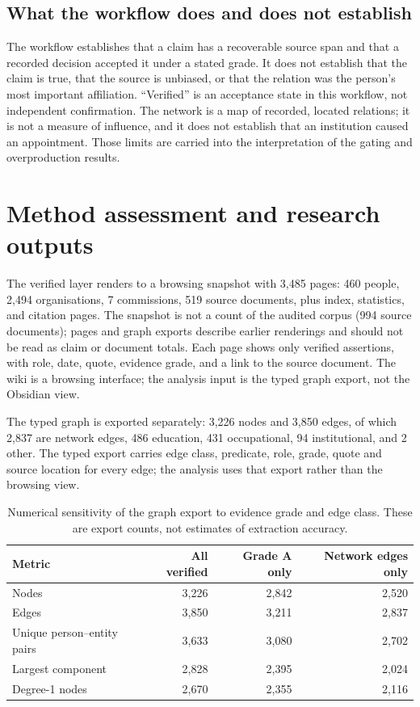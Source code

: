 \documentclass[11pt,a4paper]{article}
\begin{document}
\subsection{What the workflow does and does not establish}

The workflow establishes that a claim has a recoverable source span and that a recorded decision accepted it under a stated grade. It does not establish that the claim is true, that the source is unbiased, or that the relation was the person's most important affiliation. ``Verified'' is an acceptance state in this workflow, not independent confirmation. The network is a map of recorded, located relations; it is not a measure of influence, and it does not establish that an institution caused an appointment. Those limits are carried into the interpretation of the gating and overproduction results.

\section{Method assessment and research outputs}

The verified layer renders to a browsing snapshot with 3,485 pages: 460 people, 2,494 organisations, 7 commissions, 519 source documents, plus index, statistics, and citation pages. The snapshot is not a count of the audited corpus (994 source documents); pages and graph exports describe earlier renderings and should not be read as claim or document totals. Each page shows only verified assertions, with role, date, quote, evidence grade, and a link to the source document. The wiki is a browsing interface; the analysis input is the typed graph export, not the Obsidian view.

The typed graph is exported separately: 3,226 nodes and 3,850 edges, of which 2,837 are network edges, 486 education, 431 occupational, 94 institutional, and 2 other. The typed export carries edge class, predicate, role, grade, quote and source location for every edge; the analysis uses that export rather than the browsing view.

\begin{table}[htbp]
\centering
\small
\begin{tabular}{lrrr}
\toprule
Metric & All verified & Grade A only & Network edges only \\
\midrule
Nodes & 3,226 & 2,842 & 2,520 \\
Edges & 3,850 & 3,211 & 2,837 \\
Unique person--entity pairs & 3,633 & 3,080 & 2,702 \\
Largest component & 2,828 & 2,395 & 2,024 \\
Degree-1 nodes & 2,670 & 2,355 & 2,116 \\
\bottomrule
\end{tabular}
\caption{Numerical sensitivity of the graph export to evidence grade and edge class. These are export counts, not estimates of extraction accuracy.}
\label{tab:graph-sensitivity}
\end{table}
\end{document}
